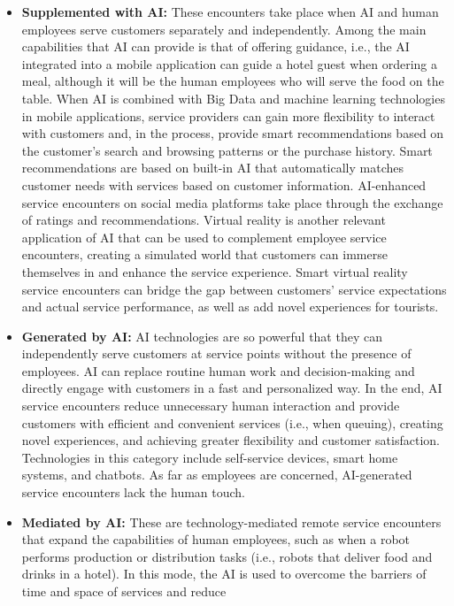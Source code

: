 \documentclass[
  letterpaper,
  DIV=11,
  numbers=noendperiod]{scrreprt}
\begin{document}
\begin{itemize}
\item
  \textbf{Supplemented with AI:} These encounters take place when AI and
  human employees serve customers separately and independently. Among
  the main capabilities that AI can provide is that of offering
  guidance, i.e., the AI integrated into a mobile application can guide
  a hotel guest when ordering a meal, although it will be the human
  employees who will serve the food on the table. When AI is combined
  with Big Data and machine learning technologies in mobile
  applications, service providers can gain more flexibility to interact
  with customers and, in the process, provide smart recommendations
  based on the customer's search and browsing patterns or the purchase
  history. Smart recommendations are based on built-in AI that
  automatically matches customer needs with services based on customer
  information. AI-enhanced service encounters on social media platforms
  take place through the exchange of ratings and recommendations.
  Virtual reality is another relevant application of AI that can be used
  to complement employee service encounters, creating a simulated world
  that customers can immerse themselves in and enhance the service
  experience. Smart virtual reality service encounters can bridge the
  gap between customers' service expectations and actual service
  performance, as well as add novel experiences for tourists.
\item
  \textbf{Generated by AI:} AI technologies are so powerful that they
  can independently serve customers at service points without the
  presence of employees. AI can replace routine human work and
  decision-making and directly engage with customers in a fast and
  personalized way. In the end, AI service encounters reduce unnecessary
  human interaction and provide customers with efficient and convenient
  services (i.e., when queuing), creating novel experiences, and
  achieving greater flexibility and customer satisfaction. Technologies
  in this category include self-service devices, smart home systems, and
  chatbots. As far as employees are concerned, AI-generated service
  encounters lack the human touch.
\item
  \textbf{Mediated by AI:} These are technology-mediated remote service
  encounters that expand the capabilities of human employees, such as
  when a robot performs production or distribution tasks (i.e., robots
  that deliver food and drinks in a hotel). In this mode, the AI is used
  to overcome the barriers of time and space of services and reduce

\end{itemize}
\end{document}
